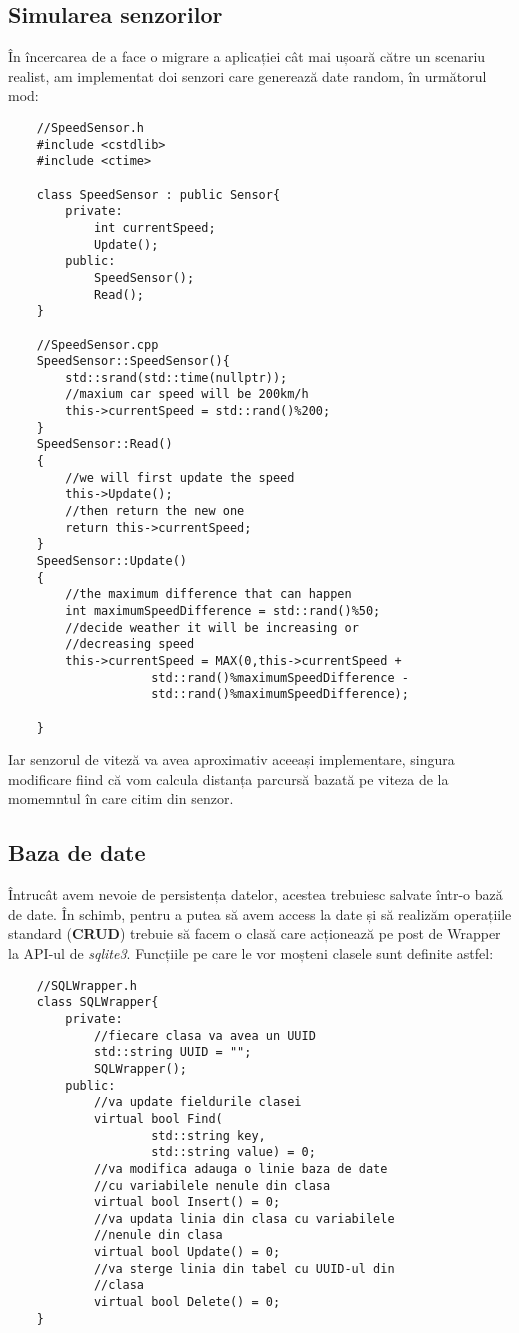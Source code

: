 \documentclass{article}
\begin{document}
\subsection{Simularea senzorilor}
În încercarea de a face o migrare a aplicației cât mai ușoară către un scenariu realist, am implementat doi senzori care generează date random, în următorul mod:
\vspace{10cm}
\begin{lstlisting}
    //SpeedSensor.h
    #include <cstdlib>
    #include <ctime>

    class SpeedSensor : public Sensor{
        private:
            int currentSpeed;
            Update();
        public:
            SpeedSensor();
            Read();
    }

    //SpeedSensor.cpp
    SpeedSensor::SpeedSensor(){
        std::srand(std::time(nullptr));
        //maxium car speed will be 200km/h
        this->currentSpeed = std::rand()%200;
    }
    SpeedSensor::Read()
    {
        //we will first update the speed 
        this->Update();
        //then return the new one
        return this->currentSpeed;
    }
    SpeedSensor::Update()
    {
        //the maximum difference that can happen
        int maximumSpeedDifference = std::rand()%50;
        //decide weather it will be increasing or 
        //decreasing speed
        this->currentSpeed = MAX(0,this->currentSpeed + 
                    std::rand()%maximumSpeedDifference - 
                    std::rand()%maximumSpeedDifference);
    
    }
\end{lstlisting}
Iar senzorul de viteză va avea aproximativ aceeași implementare, singura modificare fiind că vom calcula distanța parcursă bazată pe viteza de la momemntul în care citim din senzor. 

\subsection{Baza de date}
Întrucât avem nevoie de persistența datelor, acestea trebuiesc salvate într-o bază de date. În schimb, pentru a putea să avem access la date și să realizăm operațiile standard (\textbf{CRUD}) trebuie să facem o clasă care acționează pe post de Wrapper la API-ul de \textit{sqlite3}. Funcțiile pe care le vor moșteni clasele sunt definite astfel:

\begin{lstlisting}
    //SQLWrapper.h
    class SQLWrapper{
        private:
            //fiecare clasa va avea un UUID
            std::string UUID = "";
            SQLWrapper();
        public:
            //va update fieldurile clasei
            virtual bool Find(
                    std::string key, 
                    std::string value) = 0;
            //va modifica adauga o linie baza de date 
            //cu variabilele nenule din clasa
            virtual bool Insert() = 0;
            //va updata linia din clasa cu variabilele
            //nenule din clasa
            virtual bool Update() = 0;
            //va sterge linia din tabel cu UUID-ul din 
            //clasa
            virtual bool Delete() = 0;            
    }
\end{lstlisting}
\end{document}

